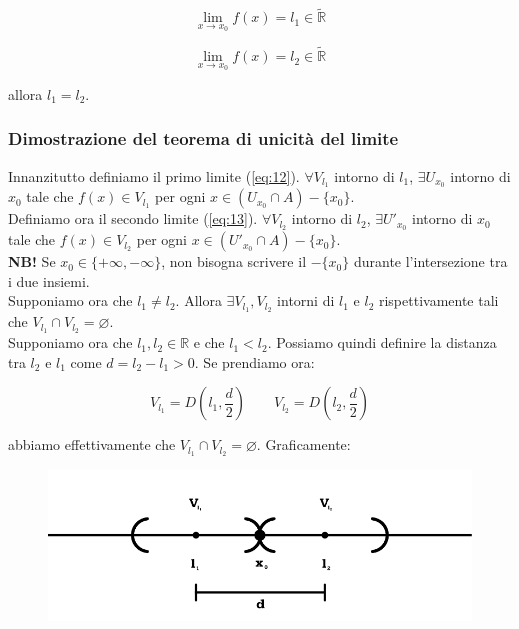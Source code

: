\documentclass{article}
\begin{document}
\begin{equation}
    \lim_{x\to x_0}f(x) = l_1 \in \widetilde{\mathbb{R}}
    \label{eq:12}
\end{equation}

\begin{equation}
    \lim_{x\to x_0}f(x) = l_2 \in \widetilde{\mathbb{R}}
    \label{eq:13}
\end{equation}

\noindent allora $l_1 = l_2$.

\subsubsection{Dimostrazione del teorema di unicità del limite}
Innanzitutto definiamo il primo limite (\ref{eq:12}). $\forall V_{l_1}$ intorno di $l_1$, $\exists U_{x_0}$ intorno di $x_0$ tale che $f(x) \in V_{l_1}$ per ogni $x \in (U_{x_0} \cap A) - \{x_0\}$.\\
Definiamo ora il secondo limite (\ref{eq:13}). $\forall V_{l_2}$ intorno di $l_2$, $\exists U'_{x_0}$ intorno di $x_0$ tale che $f(x) \in V_{l_2}$ per ogni $x \in (U'_{x_0} \cap A) - \{x_0\}$.\\

\noindent\textbf{NB!} Se $x_0 \in \{+\infty, -\infty\}$, non bisogna scrivere il $- \{x_0\}$ durante l'intersezione tra i due insiemi.\\

\noindent Supponiamo ora che $l_1 \neq l_2$. Allora $\exists V_{l_1}, V_{l_2}$ intorni di $l_1$ e $l_2$ rispettivamente tali che $V_{l_1} \cap V_{l_2} = \varnothing$.\\
Supponiamo ora che $l_1, l_2 \in \mathbb{R}$ e che $l_1 < l_2$. Possiamo quindi definire la distanza tra $l_2$ e $l_1$ come $d = l_2 - l_1 > 0$. Se prendiamo ora:

\begin{equation*}
    V_{l_1} = D\left(l_1, \frac{d}{2}\right) \qquad V_{l_2} = D\left(l_2, \frac{d}{2}\right)
\end{equation*}

\noindent abbiamo effettivamente che $V_{l_1} \cap V_{l_2} = \varnothing$. Graficamente:

\begin{figure}[!h]
    \centering
    \includegraphics[width=12cm]{./images/interval3.pdf}
\end{figure}
\end{document}
